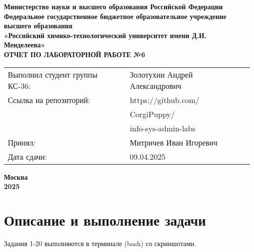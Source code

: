 \documentclass[12pt, a4paper]{report}
\begin{document}
	\begin{titlepage}
		\begin{center}
			\large \textbf{Министерство науки и высшего образования Российской Федерации} \\
			\large \textbf{Федеральное государственное бюджетное образовательное учреждение высшего образования} \\
			\large \textbf{«Российский химико-технологический университет имени Д.И. Менделеева»} \\

			\vspace*{4cm}
			\LARGE \textbf{ОТЧЕТ ПО ЛАБОРАТОРНОЙ РАБОТЕ №6}

			\vspace*{4cm}
			\begin{flushright}
				\Large
				\begin{tabular}{>{\raggedleft\arraybackslash}p{8.85cm} p{10.8cm}}
					Выполнил студент группы КС-36: & Золотухин Андрей Александрович \\
					Ссылка на репозиторий: & https://github.com/ \\ 
					& CorgiPuppy/ \\
					& info-sys-admin-labs \\
					Принял: & Митричев Иван Игоревич \\
					Дата сдачи: & 09.04.2025 \\
				\end{tabular}

			\end{flushright}

			\vspace*{6cm}
			\Large \textbf{Москва \\ 2025}
		\end{center}
	\end{titlepage}
	
	\tableofcontents	
	\thispagestyle{empty}
	\newpage

	
	\section*{Описание и выполнение задачи}
	\large
	Задания 1-20 выполняются в терминале (bash) со скриншотами. \par
\end{document}
